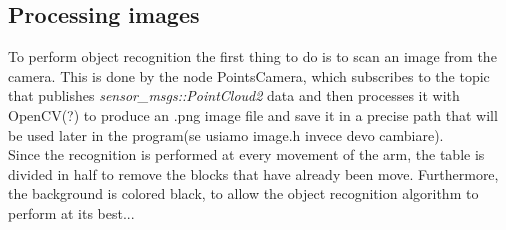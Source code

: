 \documentclass[12pt,a4paper]{article}
\begin{document}
\subsection{Processing images}\label{subsec:imageproc}
To perform object recognition the first thing to do is to scan an image from the camera. This is done by the node PointsCamera, which subscribes to the topic that publishes \textit{sensor\_msgs::PointCloud2} data and then processes it with OpenCV(?) to produce an .png image file and save it in a precise path that will be used later in the program(se usiamo image.h invece devo cambiare).\\Since the recognition is performed at every movement of the arm, the table is divided in half to remove the blocks that have already been move. Furthermore, the background is colored black, to allow the object recognition algorithm to perform at its best...
\end{document}
